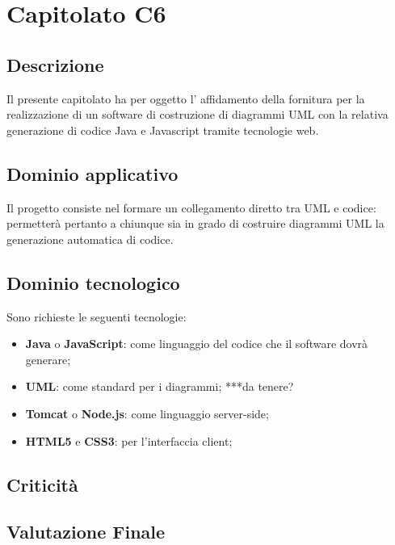 \section {Capitolato C6}
	\subsection {Descrizione}
	Il presente capitolato ha per oggetto l’ affidamento della fornitura per la realizzazione
di un software di costruzione di diagrammi UML con la relativa generazione di codice
Java e Javascript tramite tecnologie web.
	\subsection {Dominio applicativo}
	Il progetto consiste nel formare un collegamento diretto tra UML e codice: permetterà pertanto a chiunque sia in grado di costruire diagrammi UML la generazione automatica di codice.
	\subsection {Dominio tecnologico}
	Sono richieste le seguenti tecnologie:
	\begin {itemize}
	\item \textbf{Java} o \textbf{JavaScript}: come linguaggio del codice che il software dovrà generare;
	\item \textbf{UML}: come standard per i diagrammi; ***da tenere?
	\item \textbf{Tomcat} o \textbf{Node.js}: come linguaggio server-side;
	\item \textbf{HTML5} e \textbf{CSS3}: per l'interfaccia client;
	\end {itemize}
	\subsection {Criticità}
	\subsection {Valutazione Finale}